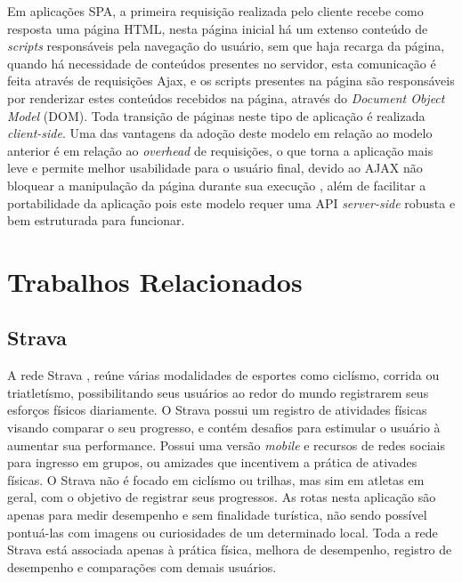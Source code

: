 Em aplicações SPA, a primeira requisição realizada pelo cliente recebe como resposta uma página HTML, nesta página inicial há um extenso conteúdo de
\textit{scripts} responsáveis pela navegação do usuário, sem que haja recarga da página, quando há necessidade de conteúdos presentes no servidor, 
esta comunicação é feita através de requisições Ajax, e os scripts presentes na página são responsáveis por renderizar estes conteúdos recebidos na
página, através do \textit{Document Object Model} (DOM). Toda transição de páginas neste tipo de aplicação é realizada \textit{client-side}. 
Uma das vantagens da adoção deste modelo em relação ao modelo anterior é em relação ao \textit{overhead} de requisições, o que torna a aplicação 
mais leve e permite melhor usabilidade para o usuário final, devido ao AJAX não bloquear a manipulação da página durante sua execução \cite{spa01}, 
além de facilitar a portabilidade da aplicação pois este modelo requer uma API \textit{server-side} robusta e bem estruturada para funcionar.

\section{Trabalhos Relacionados}
\subsection{Strava}
A rede Strava \cite{strava}, reúne várias modalidades de esportes como ciclísmo, corrida ou triatletísmo, possibilitando seus usuários ao redor do 
mundo registrarem seus esforços físicos diariamente. O Strava possui um registro de atividades físicas visando comparar o seu progresso, e contém 
desafios para estimular o usuário à aumentar sua performance. Possui uma versão \textit{mobile} e recursos de redes sociais para ingresso em grupos, 
ou amizades que incentivem a prática de ativades físicas. O Strava não é focado em ciclísmo ou trilhas, mas sim em atletas em geral, com o objetivo 
de registrar seus progressos. As rotas nesta aplicação são apenas para medir desempenho e sem finalidade turística, não sendo possível pontuá-las 
com imagens ou curiosidades de um determinado local. Toda a rede Strava está associada apenas à prática física, melhora de desempenho, 
registro de desempenho e comparações com demais usuários.

